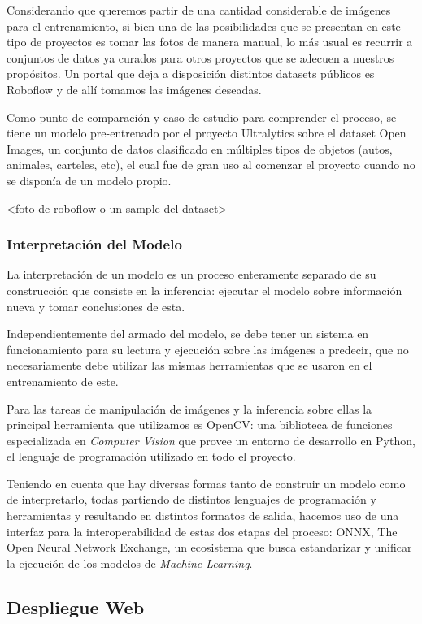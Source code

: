 \documentclass[a4paper]{article}
\begin{document}
Considerando que queremos partir de una cantidad considerable de imágenes para el entrenamiento, si bien una de las posibilidades que se presentan en este tipo de proyectos es tomar las fotos de manera manual, lo más usual es recurrir a conjuntos de datos ya curados para otros proyectos que se adecuen a nuestros propósitos. Un portal que deja a disposición distintos datasets públicos es Roboflow y de allí tomamos las imágenes deseadas.

Como punto de comparación y caso de estudio para comprender el proceso, se tiene un modelo pre-entrenado por el proyecto Ultralytics sobre el dataset Open Images, un conjunto de datos clasificado en múltiples tipos de objetos (autos, animales, carteles, etc), el cual fue de gran uso al comenzar el proyecto cuando no se disponía de un modelo propio.

<foto de roboflow o un sample del dataset>

\subsubsection{Interpretación del Modelo}

La interpretación de un modelo es un proceso enteramente separado de su construcción que consiste en la inferencia: ejecutar el modelo sobre información nueva y tomar conclusiones de esta.

Independientemente del armado del modelo, se debe tener un sistema en funcionamiento para su lectura y ejecución sobre las imágenes a predecir, que no necesariamente debe utilizar las mismas herramientas que se usaron en el entrenamiento de este.

Para las tareas de manipulación de imágenes y la inferencia sobre ellas la principal herramienta que utilizamos es OpenCV\cite{opencv}: una biblioteca de funciones especializada en \textit{Computer Vision} que provee un entorno de desarrollo en Python, el lenguaje de programación utilizado en todo el proyecto.

Teniendo en cuenta que hay diversas formas tanto de construir un modelo como de interpretarlo, todas partiendo de distintos lenguajes de programación y herramientas y resultando en distintos formatos de salida, hacemos uso de una interfaz para la interoperabilidad de estas dos etapas del proceso: ONNX, The Open Neural Network Exchange, un ecosistema que busca estandarizar y unificar la ejecución de los modelos de \textit{Machine Learning}.

\subsection{Despliegue Web}
\end{document}
